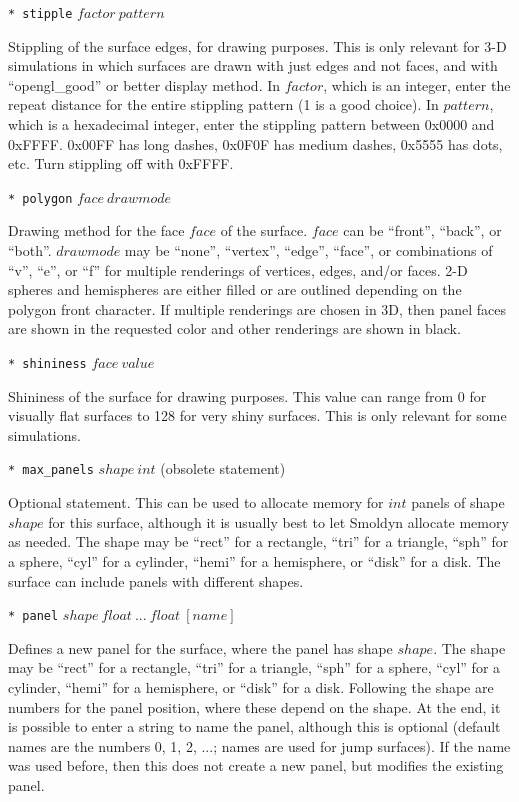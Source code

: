\documentclass {scrbook}
\newcommand {\ttt} {\texttt}
\begin{document}
\begin{description}
\item{\ttt{* stipple} $factor\ pattern$}

Stippling of the surface edges, for drawing purposes. This is only relevant for 3-D simulations in which surfaces are drawn with just edges and not faces, and with ``opengl\_good'' or better display method. In $factor$, which is an integer, enter the repeat distance for the entire stippling pattern (1 is a good choice). In $pattern$, which is a hexadecimal integer, enter the stippling pattern between 0x0000 and 0xFFFF. 0x00FF has long dashes, 0x0F0F has medium dashes, 0x5555 has dots, etc. Turn stippling off with 0xFFFF.

\item{\ttt{* polygon} $face\ drawmode$}

Drawing method for the face $face$ of the surface. $face$ can be ``front'', ``back'', or ``both''. $drawmode$ may be ``none'', ``vertex'', ``edge'', ``face'', or combinations of ``v'', ``e'', or ``f'' for multiple renderings of vertices, edges, and/or faces. 2-D spheres and hemispheres are either filled or are outlined depending on the polygon front character. If multiple renderings are chosen in 3D, then panel faces are shown in the requested color and other renderings are shown in black.

\item{\ttt{* shininess} $face\ value$}

Shininess of the surface for drawing purposes. This value can range from 0 for visually flat surfaces to 128 for very shiny surfaces. This is only relevant for some simulations.

\item{\ttt{* max\_panels} $shape\ int$ (obsolete statement)}

Optional statement. This can be used to allocate memory for $int$ panels of shape $shape$ for this surface, although it is usually best to let Smoldyn allocate memory as needed. The shape may be ``rect'' for a rectangle, ``tri'' for a triangle, ``sph'' for a sphere, ``cyl'' for a cylinder, ``hemi'' for a hemisphere, or ``disk'' for a disk. The surface can include panels with different shapes.

\item{\ttt{* panel} $shape\ float\ ...\ float\ [name]$}

Defines a new panel for the surface, where the panel has shape $shape$.  The shape may be ``rect'' for a rectangle, ``tri'' for a triangle, ``sph'' for a sphere, ``cyl'' for a cylinder, ``hemi'' for a hemisphere, or ``disk'' for a disk. Following the shape are numbers for the panel position, where these depend on the shape. At the end, it is possible to enter a string to name the panel, although this is optional (default names are the numbers 0, 1, 2, ...; names are used for jump surfaces). If the name was used before, then this does not create a new panel, but modifies the existing panel.


\end{description}
\end{document}
